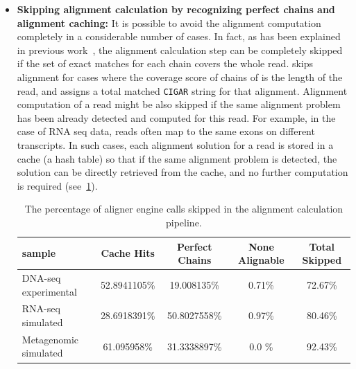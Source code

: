 \begin{itemize}
    \item \textbf{Skipping alignment calculation by recognizing perfect chains 
    and alignment caching:} 
    It is possible to avoid the alignment computation completely in a considerable number of 
    cases. In fact, as has been explained in previous work~\citep{selaln}, the alignment 
    calculation step can be completely skipped if the set of exact matches for each chain 
    covers the whole read. \puffaligner skips alignment for cases where the coverage score 
    of chains of \mems is the length of the read, and assigns a total matched \texttt{CIGAR} string 
    for that alignment. Alignment computation of a read might be also skipped if the same 
    alignment problem has been already detected and computed for this read. For example, 
    in the case of RNA seq data, reads often map to the same exons on different transcripts. 
    In such cases, each alignment solution for a read is stored in a cache (a hash table) so 
    that if the same alignment problem is detected, the solution can be directly retrieved from 
    the cache, and no further computation is required (see~\cref{tab:skipped-alignments}).


    \begin{table}%
    \centering
    \begin{tabular}{lcccc}
        \toprule sample & Cache Hits & Perfect Chains & None Alignable & Total Skipped \\
        \midrule
        DNA-seq experimental & \num{52.8941105}\% & \num{19.008135}\% & \num{0.71}\% & \num{72.67}\% \\
        RNA-seq simulated & \num{28.6918391}\% & \num{50.8027558}\% & \num{0.97}\% & \num{80.46}\% \\
        Metagenomic simulated & \num{61.095958}\% & \num{31.3338897}\% & \num{0.0} \% & \num{92.43}\% \\
        \bottomrule
    \end{tabular}
    \caption[he percentage of skipped aligner engine calls]{The percentage of aligner engine calls skipped in the alignment calculation pipeline.}
    \label{tab:skipped-alignments}
    \end{table}


\end{itemize}
